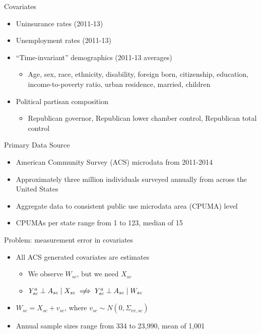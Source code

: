 \documentclass[hyperref={pdfpagelabels=false}]{beamer}
\begin{document}
\begin{frame}{Covariates}
\begin{itemize}
    \item Uninsurance rates (2011-13) \bigskip
    \item Unemployment rates (2011-13) \bigskip
    \item ``Time-invariant'' demographics (2011-13 averages) \bigskip
    \begin{itemize}
        \item Age, sex, race, ethnicity, disability, foreign born, citizenship, education, income-to-poverty ratio, urban residence, married, children \bigskip
    \end{itemize}
    \item Political partisan composition \bigskip
    \begin{itemize}
        \item Republican governor, Republican lower chamber control, Republican total control
    \end{itemize}
\end{itemize}
\end{frame}

\begin{frame}{Primary Data Source}
    \begin{itemize}
    \item American Community Survey (ACS) microdata from 2011-2014 \bigskip 
    \item Approximately three million individuals surveyed annually from across the United States \bigskip 
    \item Aggregate data to consistent public use microdata area (CPUMA) level \bigskip
    \item CPUMAs per state range from 1 to 123, median of 15
    \end{itemize}
\end{frame}   

\begin{frame}{Problem: measurement error in covariates}
    \begin{itemize}
        \item All ACS generated covariates are estimates \bigskip
        \begin{itemize}
            \item We observe $W_{sc}$, but we need $X_{sc}$ \bigskip
            \item $Y_{sc}^a \perp A_{sc} \mid X_{sc} \centernot\implies Y_{sc}^a \perp A_{sc} \mid W_{sc}$ \bigskip
        \end{itemize}
        \item $W_{sc} = X_{sc} + v_{sc}$, where $v_{sc} \sim N(0, \Sigma_{vv, sc})$ \bigskip
        \item Annual sample sizes range from 334 to 23,990, mean of 1,001 \bigskip
    \end{itemize}
\end{frame}
\end{document}
